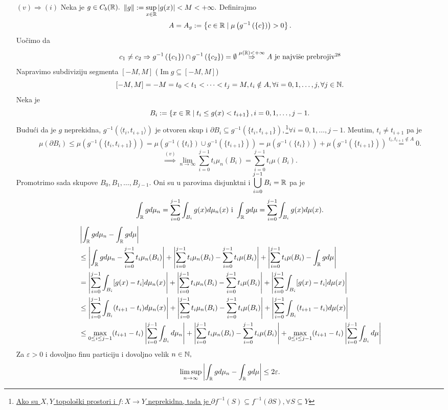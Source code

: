 \documentclass{article}
\begin{document}
\begin{itemize}
    \item[\(\boxed{(v)\Rightarrow (i)}\)] Neka je \(g\in C_b(\Bbb R).\) \(\|g\|:=\displaystyle\sup_{x\in\Bbb R}|g(x)|<M<+\infty.\) Definirajmo \[A=A_g:=\left\{c\in\Bbb R\mid\mu\left(g^{-1}\left(\{c\}\right)\right)>0\right\}.\] Uočimo da \[c_1\ne c_2\Rightarrow g^{-1}\left(\{c_1\}\right)\cap g^{-1}\left(\{c_2\}\right)=\emptyset\overset{\mu(\Bbb R)<+\infty}{\Rightarrow}A\text{ je najviše prebrojiv}\footnotemark[28]\] Napravimo subdiviziju segmenta \([-M,M]\) (\(\operatorname{Im} g\subseteq[-M,M]\)) \[[-M,M]=-M=t_0<t_1<\cdots<t_j=M, t_i\notin A,\forall i=0,1,\ldots,j,\forall j\in\Bbb N.\]  Neka je \[B_i:=\left\{x\in\Bbb R\mid t_i\le g(x)<t_{i+1}\right\},i=0,1,\ldots,j-1.\] Budući da je \(g\) neprekidna, \(g^{-1}\left(\langle t_i,t_{i+1}\rangle\right)\) je otvoren skup i \(\partial B_i\subseteq g^{-1}\left(\{t_i,t_{i+1}\}\right),\)\footnote[29]{\href{https://math.stackexchange.com/a/2529896/721644}{Ako su \(X,Y\) topološki prostori i \(f:X\to Y\) neprekidna, tada je \(\partial f^{-1}(S)\subseteq f^{-1}(\partial S),\forall S\subseteq Y\)}}\newline \(\forall i=0,1,\ldots,j-1.\) Me\dj{}utim, \(t_i\ne t_{i+1}\) pa je \[\mu(\partial B_i)\le\mu\left(g^{-1}\left(\{t_i,t_{i+1}\}\right)\right)=\mu\left(g^{-1}\left(\{t_i\}\right)\cup g^{-1}\left(\{t_{i+1}\}\right)\right)=\mu\left(g^{-1}\left(\{t_i\}\right)\right)+\mu\left(g^{-1}\left(\{t_{i+1}\}\right)\right)\overset{t_i,t_{i+1}\notin A}{=}0.\] \[\overset{(v)}{\Rightarrow}\lim_{n\to\infty}\sum_{i=0}^{j-1}t_i\mu_n(B_i)=\sum_{i=0}^{j-1}t_i\mu(B_i).\] Promotrimo sada skupove \(B_0,B_1,\ldots, B_{j-1}.\) Oni su u parovima disjunktni i \(\displaystyle\bigcup_{i=0}^{j-1}B_i=\Bbb R\) pa je \[\int_{\Bbb R}gd\mu_n=\sum_{i=0}^{j-1}\int_{B_i}g(x)d\mu_n(x)\text{ i }\int_{\Bbb R}gd\mu=\sum_{i=0}^{j-1}\int_{B_i}g(x)d\mu(x).\]   \[\begin{aligned}&\left|\int_{\Bbb R}gd\mu_n-\int_{\Bbb R}gd\mu\right|\\&\le\left|\int_{\Bbb R}gd\mu_n-\sum_{i=0}^{j-1}t_i\mu_n(B_i)\right|+\left|\sum_{i=0}^{j-1}t_i\mu_n(B_i)-\sum_{i=0}^{j-1}t_i\mu(B_i)\right|+\left|\sum_{i=0}^{j-1}t_i\mu(B_i)-\int_{\Bbb R}gd\mu\right|\\&=\left|\sum_{i=0}^{j-1}\int_{B_i}[g(x)-t_i]d\mu_n(x)\right|+\left|\sum_{i=0}^{j-1}t_i\mu_n(B_i)-\sum_{i=0}^{j-1}t_i\mu(B_i)\right|+\left|\sum_{i=0}^{j-1}\int_{B_i}[g(x)-t_i]d\mu(x)\right|\\&\le\left|\sum_{i=0}^{j-1}\int_{B_i}(t_{i+1}-t_i)d\mu_n(x)\right|+\left|\sum_{i=0}^{j-1}t_i\mu_n(B_i)-\sum_{i=0}^{j-1}t_i\mu(B_i)\right|+\left|\sum_{i=0}^{j-1}\int_{B_i}(t_{i+1}-t_i)d\mu(x)\right|\\&\le\max_{0\le i\le j-1}(t_{i+1}-t_i)\left|\sum_{i=0}^{j-1}\int_{B_i}d\mu_n\right|+\left|\sum_{i=0}^{j-1}t_i\mu_n(B_i)-\sum_{i=0}^{j-1}t_i\mu(B_i)\right|+\max_{0\le i\le j-1}(t_{i+1}-t_i)\left|\sum_{i=0}^{j-1}\int_{B_i}d\mu\right|\end{aligned}\]  Za \(\varepsilon>0\) i dovoljno finu particiju i dovoljno velik \(n\in\Bbb N,\)  \[\underset{n\to\infty}{\lim\sup }\left|\int_{\Bbb R}gd\mu_n-\int_{\Bbb R}gd\mu\right|\le2\varepsilon.\] 

\end{itemize}
\end{document}
